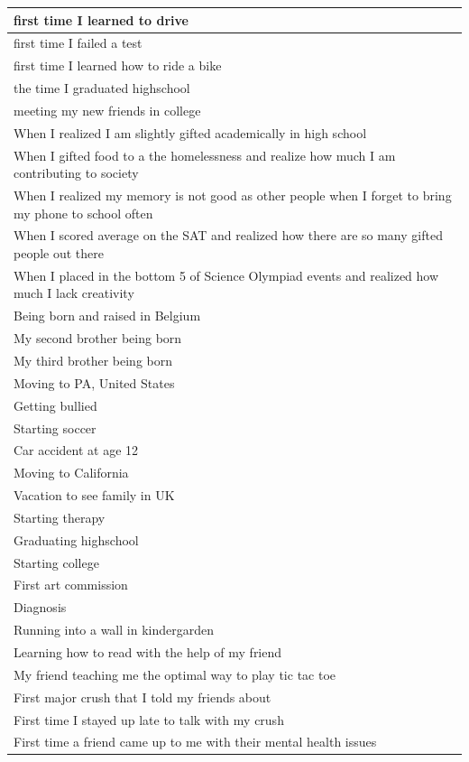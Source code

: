 \documentclass[
  .7em,
  letterpaper,
  DIV=11,
  numbers=noendperiod]{scrartcl}
\begin{document}
\begin{table}
\begin{tabular}{l}
\hline
first time I learned to drive\\
\hline
first time I failed a test\\
\hline
first time I learned how to ride a bike\\
\hline
the time I graduated highschool\\
\hline
meeting my new friends in college\\
\hline
When I realized I am slightly gifted academically in high school\\
\hline
When I gifted food to a the homelessness and realize how much I am contributing to society\\
\hline
When I realized my memory is not good as other people when I forget to bring my phone to school often\\
\hline
When I scored average on the SAT and realized how there are so many gifted people out there\\
\hline
When I placed in the bottom 5 of Science Olympiad events and realized how much I lack creativity\\
\hline
Being born and raised in Belgium\\
\hline
My second brother being born\\
\hline
My third brother being born\\
\hline
Moving to PA, United States\\
\hline
Getting bullied\\
\hline
Starting soccer\\
\hline
Car accident at age 12\\
\hline
Moving to California\\
\hline
Vacation to see family in UK\\
\hline
Starting therapy\\
\hline
Graduating highschool\\
\hline
Starting college\\
\hline
First art commission\\
\hline
Diagnosis\\
\hline
Running into a wall in kindergarden\\
\hline
Learning how to read with the help of my friend\\
\hline
My friend teaching me the optimal way to play tic tac toe\\
\hline
First major crush that I told my friends about\\
\hline
First time I stayed up late to talk with my crush\\
\hline
First time a friend came up to me with their mental health issues\\

\end{tabular}
\end{table}
\end{document}
